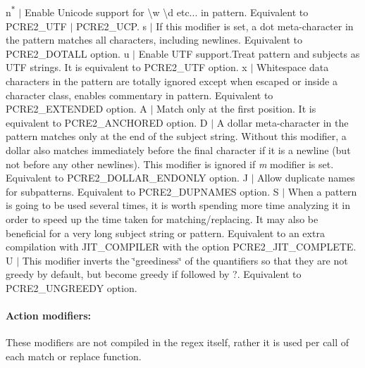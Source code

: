 {\ttfamily n}\textsuperscript{$\ast$} $\vert$ Enable Unicode support for {\ttfamily \textbackslash{}w \textbackslash{}d} etc... in pattern. Equivalent to {\ttfamily P\+C\+R\+E2\+\_\+\+U\+TF $\vert$ P\+C\+R\+E2\+\_\+\+U\+CP}. {\ttfamily s} $\vert$ If this modifier is set, a dot meta-\/character in the pattern matches all characters, including newlines. Equivalent to {\ttfamily P\+C\+R\+E2\+\_\+\+D\+O\+T\+A\+LL} option. {\ttfamily u} $\vert$ Enable U\+TF support.\+Treat pattern and subjects as U\+TF strings. It is equivalent to {\ttfamily P\+C\+R\+E2\+\_\+\+U\+TF} option. {\ttfamily x} $\vert$ Whitespace data characters in the pattern are totally ignored except when escaped or inside a character class, enables commentary in pattern. Equivalent to {\ttfamily P\+C\+R\+E2\+\_\+\+E\+X\+T\+E\+N\+D\+ED} option. {\ttfamily A} $\vert$ Match only at the first position. It is equivalent to {\ttfamily P\+C\+R\+E2\+\_\+\+A\+N\+C\+H\+O\+R\+ED} option. {\ttfamily D} $\vert$ A dollar meta-\/character in the pattern matches only at the end of the subject string. Without this modifier, a dollar also matches immediately before the final character if it is a newline (but not before any other newlines). This modifier is ignored if {\itshape m} modifier is set. Equivalent to {\ttfamily P\+C\+R\+E2\+\_\+\+D\+O\+L\+L\+A\+R\+\_\+\+E\+N\+D\+O\+N\+LY} option. {\ttfamily J} $\vert$ Allow duplicate names for subpatterns. Equivalent to {\ttfamily P\+C\+R\+E2\+\_\+\+D\+U\+P\+N\+A\+M\+ES} option. {\ttfamily S} $\vert$ When a pattern is going to be used several times, it is worth spending more time analyzing it in order to speed up the time taken for matching/replacing. It may also be beneficial for a very long subject string or pattern. Equivalent to an extra compilation with J\+I\+T\+\_\+\+C\+O\+M\+P\+I\+L\+ER with the option {\ttfamily P\+C\+R\+E2\+\_\+\+J\+I\+T\+\_\+\+C\+O\+M\+P\+L\+E\+TE}. {\ttfamily U} $\vert$ This modifier inverts the \char`\"{}greediness\char`\"{} of the quantifiers so that they are not greedy by default, but become greedy if followed by {\ttfamily ?}. Equivalent to {\ttfamily P\+C\+R\+E2\+\_\+\+U\+N\+G\+R\+E\+E\+DY} option.

\paragraph*{Action modifiers\+:}

These modifiers are not compiled in the regex itself, rather it is used per call of each match or replace function.

